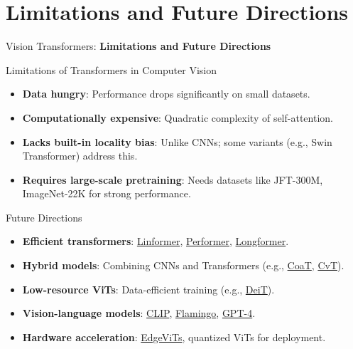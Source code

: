 \section{Limitations and Future Directions}
\begin{frame}{}
    \LARGE Vision Transformers: \textbf{Limitations and Future Directions}
\end{frame}

\begin{frame}{Limitations of Transformers in Computer Vision}
    \begin{itemize}
        \item \textbf{Data hungry}: Performance drops significantly on small datasets.
        \item \textbf{Computationally expensive}: Quadratic complexity of self-attention.
        \item \textbf{Lacks built-in locality bias}: Unlike CNNs; some variants (e.g., Swin Transformer) address this.
        \item \textbf{Requires large-scale pretraining}: Needs datasets like JFT-300M, ImageNet-22K for strong performance.
    \end{itemize}
\end{frame}

\begin{frame}{Future Directions}
    \begin{itemize}
        \item \textbf{Efficient transformers}: \href{https://arxiv.org/abs/2006.04768}{Linformer}, \href{https://arxiv.org/abs/2009.14794}{Performer}, \href{https://arxiv.org/abs/2004.05150}{Longformer}.
        \item \textbf{Hybrid models}: Combining CNNs and Transformers (e.g., \href{https://arxiv.org/abs/2104.06399}{CoaT}, \href{https://arxiv.org/abs/2103.15808}{CvT}).
        \item \textbf{Low-resource ViTs}: Data-efficient training (e.g., \href{https://arxiv.org/abs/2012.12877}{DeiT}).
        \item \textbf{Vision-language models}: \href{https://arxiv.org/abs/2103.00020}{CLIP}, \href{https://arxiv.org/abs/2204.14198}{Flamingo}, \href{https://arxiv.org/abs/2303.08774}{GPT-4}.
        \item \textbf{Hardware acceleration}: \href{https://arxiv.org/abs/2205.03436}{EdgeViTs}, quantized ViTs for deployment.
    \end{itemize}
\end{frame}